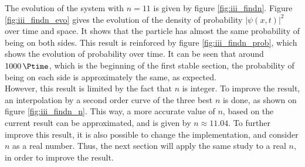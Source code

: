 \documentclass[a4paper,12pt,twoside]{article}
\newcommand{\abs}[1]{\left|#1\right|}
\begin{document}
      The evolution of the system with $n=11$ is given by figure \ref{fig:iii_findn}.
      Figure \ref{fig:iii_findn_evo} gives the evolution of the density of probability $\abs{\psi(x,t)}^2$ over time and space.
      It shows that the particle has almost the same probability of being on both sides.
      This result is reinforced by figure \ref{fig:iii_findn_prob}, which shows the evolution of probability over time.
      It can be seen that around $\SI{1000}{\Ptime}$, which is the beginning of the first stable section, the probability of being on each side is approximately the same, as expected.\\

      However, this result is limited by the fact that $n$ is integer.
      To improve the result, an interpolation by a second order curve of the three best $n$ is done, as shown on figure \ref{fig:iii_findn_n}.
      This way, a more accurate value of $n$, based on the current result can be approximated, and is given by $n\approx\num{11.04}$.
      To further improve this result, it is also possible to change the implementation, and consider $n$ as a real number.
      Thus, the next section will apply the same study to a real $n$, in order to improve the result.\\
\end{document}
